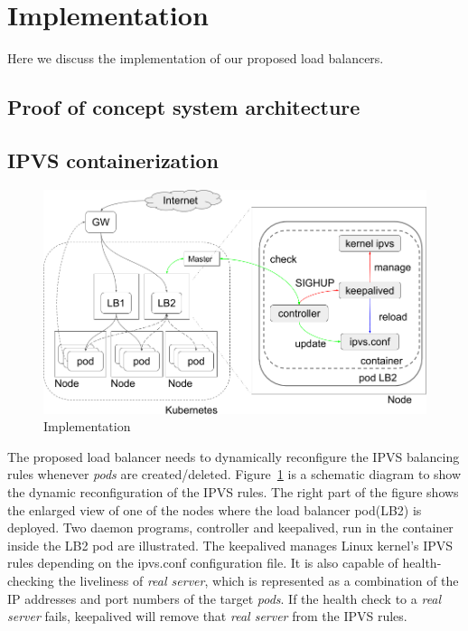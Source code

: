 \section{Implementation}\label{Implementation}

Here we discuss the implementation of our proposed load balancers.

\subsection{Proof of concept system architecture}


\subsection{IPVS containerization}

\begin{figure}
\includegraphics[width=\columnwidth]{Figs/IPVS-ingress-schem}
\caption{Implementation}
\label{fig:IPVS-ingress-schem}
\end{figure}

The proposed load balancer needs to dynamically reconfigure the IPVS balancing rules whenever {\em pods} are created/deleted. 
Figure~\ref{fig:IPVS-ingress-schem} is a schematic diagram to show the dynamic reconfiguration of the IPVS rules.
The right part of the figure shows the enlarged view of one of the nodes where the load balancer pod(LB2) is deployed.
Two daemon programs, controller and keepalived, run in the container inside the LB2 pod are illustrated.
The keepalived manages Linux kernel's IPVS rules depending on the ipvs.conf configuration file.
It is also capable of health-checking the liveliness of {\em real server}, 
which is represented as a combination of the IP addresses and port numbers of the target {\em pods}. 
If the health check to a {\em real server} fails, keepalived will remove that {\em real server} from the IPVS rules.

